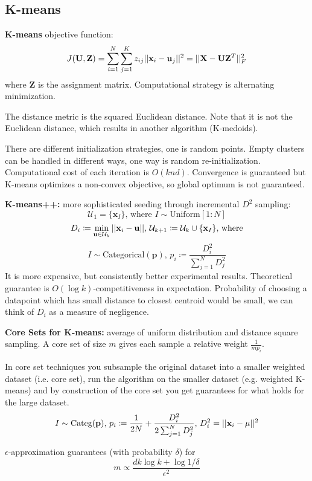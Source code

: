 \documentclass[12pt]{article}
\begin{document}
\subsection{K-means}
\textbf{K-means} objective function:
\[ J(\mathbf{U}, \mathbf{Z}) = \sum_{i=1}^N \sum_{j=1}^K z_{ij} ||\mathbf{x}_i - \mathbf{u}_j||^2 = ||\mathbf{X} - \mathbf{U}\mathbf{Z}^T||_F^2 \]
where $\mathbf{Z}$ is the assignment matrix. Computational strategy is alternating minimization.
\par The distance metric is the squared Euclidean distance. Note that it is not the Euclidean distance, which results in another algorithm (K-medoids).
\par There are different initialization strategies, one is random points. Empty clusters can be handled in different ways, one way is random re-initialization. Computational cost of each iteration is $O(knd)$. Convergence is guaranteed but K-means optimizes a non-convex objective, so global optimum is not guaranteed.
\par \textbf{K-means++:} more sophisticated seeding through incremental $D^2$ sampling:
\[ \mathcal{U}_1 = \{\mathbf{x}_I\} \text{, where } I \sim \text{Uniform}[1:N] \]
\[ D_i \coloneqq \min_{\mathbf{u}\in\mathcal{U}_k} ||\mathbf{x}_i - \mathbf{u}|| \text{, } \mathcal{U}_{k+1} \coloneqq \mathcal{U}_k \cup \{ \mathbf{x}_I \} \text{, where} \]
\[ I \sim \text{Categorical}(\mathbf{p}) \text{, } p_i \coloneqq \frac{D_i^2}{\sum_{j=1}^N D_j^2} \]
It is more expensive, but consistently better experimental results. Theoretical guarantee is $O(\log k)$-competitiveness in expectation. Probability of choosing a datapoint which has small distance to closest centroid would be small, we can think of $D_i$ as a measure of negligence.
\par \textbf{Core Sets for K-means:} average of uniform distribution and distance square sampling. A core set of size $m$ gives each sample a relative weight $\frac{1}{m p_i}$.
\par In core set techniques you subsample the original dataset into a smaller weighted dataset (i.e. core set), run the algorithm on the smaller dataset (e.g. weighted K-means) and by construction of the core set you get guarantees for what holds for the large dataset.
\[ I\sim\text{Categ}(\mathbf{p}) \text{, } p_i \coloneqq \frac{1}{2N} + \frac{D_i^2}{2\sum_{j=1}^N D_j^2} \text{, } D_i^2  = ||\mathbf{x}_i - \mu||^2 \]
\par $\epsilon$-approximation guarantees (with probability $\delta$) for
\[ m \propto \frac{dk\log k + \log 1/\delta}{\epsilon^2} \]
\end{document}
